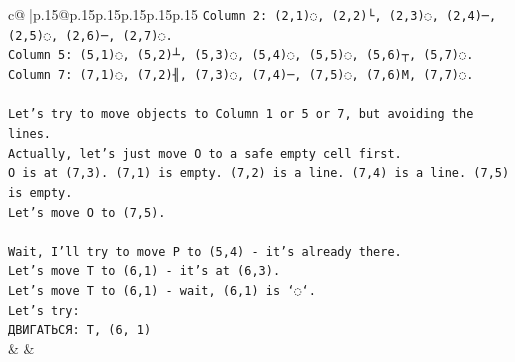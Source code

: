 \documentclass{article}
\begin{document}
{\begin{supertabular}{c@{$\;$}|p{.15\linewidth}@{}p{.15\linewidth}p{.15\linewidth}p{.15\linewidth}p{.15\linewidth}p{.15\linewidth}}
{{{\texttt{Column 2: (2,1)◌, (2,2)└, (2,3)◌, (2,4)─, (2,5)◌, (2,6)─, (2,7)◌.} \\
\texttt{Column 5: (5,1)◌, (5,2)┴, (5,3)◌, (5,4)◌, (5,5)◌, (5,6)┬, (5,7)◌.} \\
\texttt{Column 7: (7,1)◌, (7,2)╢, (7,3)◌, (7,4)─, (7,5)◌, (7,6)M, (7,7)◌.} \\
\\ 
\texttt{Let's try to move objects to Column 1 or 5 or 7, but avoiding the lines.} \\
\texttt{Actually, let's just move O to a safe empty cell first.} \\
\texttt{O is at (7,3). (7,1) is empty. (7,2) is a line. (7,4) is a line. (7,5) is empty.} \\
\texttt{Let's move O to (7,5).} \\
\\ 
\texttt{Wait, I'll try to move P to (5,4) {-} it's already there.} \\
\texttt{Let's move T to (6,1) {-} it's at (6,3).} \\
\texttt{Let's move T to (6,1) {-} wait, (6,1) is `◌`.} \\
\texttt{Let's try:} \\
\texttt{ДВИГАТЬСЯ: T, (6, 1)} \\
            }
        }
    }
    & & \\ \\


\end{supertabular}}
\end{document}
